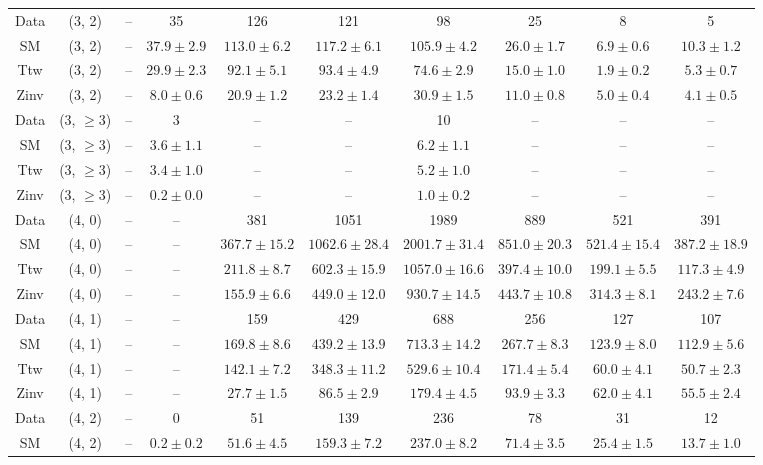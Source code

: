 \begin{table}[h!]
{\begin{tabular}{cccccccccc}
	Data & (3, 2) & -- & 35 & 126 & 121 & 98 & 25 & 8 & 5 \\[0.5ex] 
	SM & (3, 2) & -- & $37.9\pm 2.9$ & $113.0\pm 6.2$ & $117.2\pm 6.1$ & $105.9\pm 4.2$ & $26.0\pm 1.7$ & $6.9\pm 0.6$ & $10.3\pm 1.2$ \\[0.5ex] 
	Ttw & (3, 2) & -- & $29.9\pm 2.3$ & $92.1\pm 5.1$ & $93.4\pm 4.9$ & $74.6\pm 2.9$ & $15.0\pm 1.0$ & $1.9\pm 0.2$ & $5.3\pm 0.7$ \\[0.5ex] 
	Zinv & (3, 2) & -- & $8.0\pm 0.6$ & $20.9\pm 1.2$ & $23.2\pm 1.4$ & $30.9\pm 1.5$ & $11.0\pm 0.8$ & $5.0\pm 0.4$ & $4.1\pm 0.5$ \\[0.5ex] 
	Data & (3, $\ge3$) & -- & 3 & -- & -- & 10 & -- & -- & -- \\[0.5ex] 
	SM & (3, $\ge3$) & -- & $3.6\pm 1.1$ & -- & -- & $6.2\pm 1.1$ & -- & -- & -- \\[0.5ex] 
	Ttw & (3, $\ge3$) & -- & $3.4\pm 1.0$ & -- & -- & $5.2\pm 1.0$ & -- & -- & -- \\[0.5ex] 
	Zinv & (3, $\ge3$) & -- & $0.2\pm 0.0$ & -- & -- & $1.0\pm 0.2$ & -- & -- & -- \\[0.5ex] 
	Data & (4, 0) & -- & -- & 381 & 1051 & 1989 & 889 & 521 & 391 \\[0.5ex] 
	SM & (4, 0) & -- & -- & $367.7\pm 15.2$ & $1062.6\pm 28.4$ & $2001.7\pm 31.4$ & $851.0\pm 20.3$ & $521.4\pm 15.4$ & $387.2\pm 18.9$ \\[0.5ex] 
	Ttw & (4, 0) & -- & -- & $211.8\pm 8.7$ & $602.3\pm 15.9$ & $1057.0\pm 16.6$ & $397.4\pm 10.0$ & $199.1\pm 5.5$ & $117.3\pm 4.9$ \\[0.5ex] 
	Zinv & (4, 0) & -- & -- & $155.9\pm 6.6$ & $449.0\pm 12.0$ & $930.7\pm 14.5$ & $443.7\pm 10.8$ & $314.3\pm 8.1$ & $243.2\pm 7.6$ \\[0.5ex] 
	Data & (4, 1) & -- & -- & 159 & 429 & 688 & 256 & 127 & 107 \\[0.5ex] 
	SM & (4, 1) & -- & -- & $169.8\pm 8.6$ & $439.2\pm 13.9$ & $713.3\pm 14.2$ & $267.7\pm 8.3$ & $123.9\pm 8.0$ & $112.9\pm 5.6$ \\[0.5ex] 
	Ttw & (4, 1) & -- & -- & $142.1\pm 7.2$ & $348.3\pm 11.2$ & $529.6\pm 10.4$ & $171.4\pm 5.4$ & $60.0\pm 4.1$ & $50.7\pm 2.3$ \\[0.5ex] 
	Zinv & (4, 1) & -- & -- & $27.7\pm 1.5$ & $86.5\pm 2.9$ & $179.4\pm 4.5$ & $93.9\pm 3.3$ & $62.0\pm 4.1$ & $55.5\pm 2.4$ \\[0.5ex] 
	Data & (4, 2) & -- & 0 & 51 & 139 & 236 & 78 & 31 & 12 \\[0.5ex] 
	SM & (4, 2) & -- & $0.2\pm 0.2$ & $51.6\pm 4.5$ & $159.3\pm 7.2$ & $237.0\pm 8.2$ & $71.4\pm 3.5$ & $25.4\pm 1.5$ & $13.7\pm 1.0$ \\[0.5ex] 

\end{tabular}}
\end{table}
